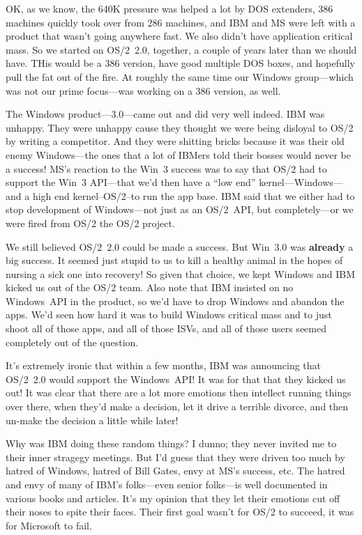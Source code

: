OK, as we know, the 640K pressure was helped a lot by DOS extenders,
386 machines quickly took over from 286 machines, and IBM and MS were
left with a product that wasn't going anywhere fast.  We also didn't
have application critical mass.  So we started on OS/2~2.0, together,
a couple of years later than we should have.  THis would be a 386
version, have good multiple DOS boxes, and hopefully pull the fat out of
the fire.  At roughly the same time our Windows group---which was not
our prime focus---was working on a 386 version, as well.

The Windows product---3.0---came out and did very well indeed.  IBM
was unhappy.  They were unhappy cause they thought we were being disloyal
to OS/2 by writing a competitor.  And they were shitting bricks because it
was their old enemy Windows---the ones that a lot of IBMers
told their bosses would never be a success!  MS's reaction to the Win~3
success was to say that OS/2 had to support the Win~3 API---that we'd
then have a ``low end'' kernel---Windows---and a high end kernel--OS/2--to
run the app base.  IBM said that we either had to stop development of
Windows---not just as an OS/2~API, but completely---or
we were fired from OS/2 the OS/2 project.

We still believed OS/2~2.0 could be made a success.  But Win~3.0 was
{\bf already} a big success.  It seemed just stupid to us to kill a healthy
animal in the hopes of nursing a sick one into recovery!  So given that
choice, we kept Windows and IBM kicked us out of the OS/2 team.  Also
note that IBM insisted on no Windows~API in the product, so we'd have
to drop Windows and abandon the apps.  We'd seen how hard it was to
build Windows critical mass and to just shoot all of those apps, 
and all of those ISVs, and all of those users seemed completely out of
the question.

It's extremely ironic that within a few months, IBM was announcing that
OS/2~2.0 would support the Windows~API!  It was for that that they
kicked us out!  It was clear that there are a lot more emotions then
intellect running things over there, when they'd make a decision, let
it drive a terrible divorce, and then un-make the decision a little while
later!  

Why was IBM doing these random things?  I dunno; they never invited me to
their inner stragegy meetings.  But I'd guess that they were driven too
much by hatred of Windows, hatred of Bill Gates, envy at MS's success, etc.
The hatred and envy of many of IBM's folks---even senior folks---is well
documented in various books and articles.  It's my opinion that they
let their emotions cut off their noses to spite their faces.  Their first
goal wasn't for OS/2 to succeed, it was for Microsoft to fail.


